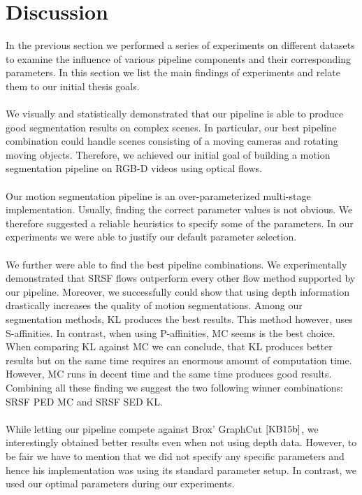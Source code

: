 \section{Discussion}
\label{sec:discussion}
In the previous section we performed a series of experiments on different datasets to examine the influence of various pipeline components and their corresponding parameters. In this section we list the main findings of experiments and relate them to our initial thesis goals. \\ \\
We visually and statistically demonstrated that our pipeline is able to produce good segmentation results on complex scenes. In particular, our best pipeline combination could handle scenes consisting of a moving cameras and rotating moving objects. Therefore, we achieved our initial goal of building a motion segmentation pipeline on RGB-D videos using optical flows. \\ \\
Our motion segmentation pipeline is an over-parameterized multi-stage implementation. Usually, finding the correct parameter values is not obvious. We therefore suggested a reliable heuristics to specify some of the parameters. In our experiments we were able to justify our default parameter selection. \\ \\
We further were able to find the best pipeline combinations. We experimentally demonstrated that SRSF flows outperform every other flow method supported by our pipeline. Moreover, we successfully could show that using depth information drastically increases the quality of motion segmentations. Among our segmentation methods, KL produces the best results. This method however, uses S-affinities. In contrast, when using P-affinities, MC seems is the best choice. When comparing KL against MC we can conclude, that KL produces better results but on the same time requires an enormous amount of computation time. However, MC runs in decent time and the same time produces good results. Combining all these finding we suggest the two following winner combinations: SRSF PED MC and SRSF SED KL. \\ \\
While letting our pipeline compete against Brox' GraphCut $\cite{KB15b}$, we interestingly obtained better results even when not using depth data. However, to be fair we have to mention that we did not specify any specific parameters and hence his implementation was using its standard parameter setup. In contrast, we used our optimal parameters during our experiments.
